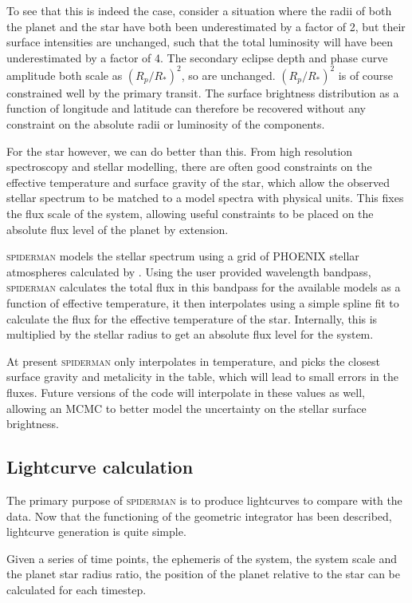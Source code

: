 \documentclass[a4paper,fleqn,usenatbib]{mnras}
\begin{document}
To see that this is indeed the case, consider a situation where the radii of both the planet and the star have both been underestimated by a factor of 2, but their surface intensities are unchanged, such that the total luminosity will have been underestimated by a factor of 4. The secondary eclipse depth and phase curve amplitude both scale as $(R_p / R_*)^2$, so are unchanged. $(R_p / R_*)^2$ is of course constrained well by the primary transit. The surface brightness distribution as a function of longitude and latitude can therefore be recovered without any constraint on the absolute radii or luminosity of the components.

For the star however, we can do better than this. From high resolution spectroscopy and stellar modelling, there are often good constraints on the effective temperature and surface gravity of the star, which allow the observed stellar spectrum to be matched to a model spectra with physical units. This fixes the flux scale of the system, allowing useful constraints to be placed on the absolute flux level of the planet by extension.

\textsc{spiderman} models the stellar spectrum using a grid of PHOENIX stellar atmospheres calculated by \citet{Husser2013}. Using the user provided wavelength bandpass, \textsc{spiderman} calculates the total flux in this bandpass for the available models as a function of effective temperature, it then interpolates using a simple spline fit to calculate the flux for the effective temperature of the star. Internally, this is multiplied by the stellar radius to get an absolute flux level for the system.

At present \textsc{spiderman} only interpolates in temperature, and picks the closest surface gravity and metalicity in the table, which will lead to small errors in the fluxes. Future versions of the code will interpolate in these values as well, allowing an MCMC to better model the uncertainty on the stellar surface brightness.

\subsection{Lightcurve calculation}\label{sec:lightcurve}

The primary purpose of \textsc{spiderman} is to produce lightcurves to compare with the data. Now that the functioning of the geometric integrator has been described, lightcurve generation is quite simple.

Given a series of time points, the ephemeris of the system, the system scale and the planet star radius ratio, the position of the planet relative to the star can be calculated for each timestep.
\end{document}
